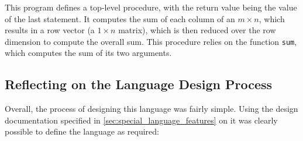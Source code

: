 This program defines a top-level procedure, with the return value being the value of the last statement. 
It computes the sum of each column of an $m \times n$, which results in a row vector (a $1 \times n$ matrix), which is then reduced over the row dimension to compute the overall sum.
This procedure relies on the function \texttt{sum}, which computes the sum of its two arguments. 


\subsection{Reflecting on the Language Design Process} %
\label{sub:reflecting_on_the_language_design_process}
Overall, the process of designing this language was fairly simple.
Using the design documentation specified in \autoref{sec:special_language_features} on  it was clearly possible to define the language as required:
